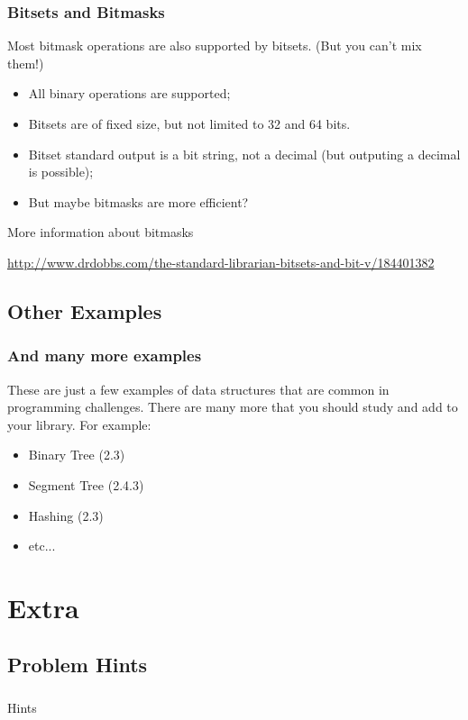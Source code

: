 \documentclass{beamer}
\begin{document}
\begin{frame}
  \frametitle{Bitsets and Bitmasks}

  {\smaller
  Most bitmask operations are also supported by bitsets. (But you can't mix them!)

  \begin{itemize}
  \item All binary operations are supported;
  \item Bitsets are of fixed size, but not limited to 32 and 64 bits.
  \item Bitset standard output is a bit string, not a decimal (but
    outputing a decimal is possible);
  \item But maybe bitmasks are more efficient?
  \end{itemize}
  
  More information about bitmasks 

  \url{http://www.drdobbs.com/the-standard-librarian-bitsets-and-bit-v/184401382}
  }
\end{frame}

\subsection{Other Examples}
\begin{frame}
  \frametitle{And many more examples}

  These are just a few examples of data structures that are common in
  programming challenges. There are many more that you should study
  and add to your library. For example:

  \bigskip

  \begin{itemize}
  \item Binary Tree (2.3)
  \item Segment Tree (2.4.3)
  \item Hashing (2.3)
  \item etc...
  \end{itemize}
\end{frame}

\section{Extra}
\subsection{Problem Hints}

\begin{frame}
  \frametitle{}

  \begin{center}
    Hints
  \end{center}
  
\end{frame}
\end{document}
